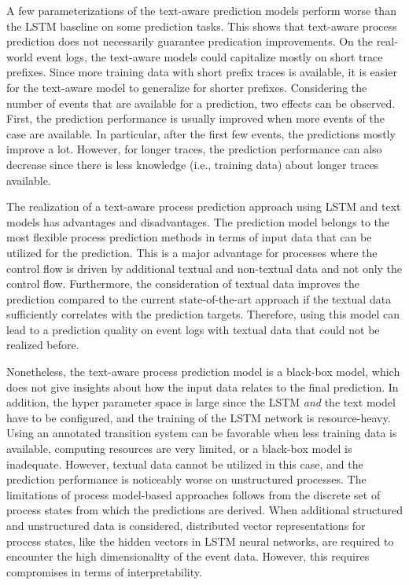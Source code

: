 A few parameterizations of the text-aware prediction models perform worse than the LSTM baseline on some prediction tasks.
This shows that text-aware process prediction does not necessarily guarantee predication improvements.
On the real-world event logs, the text-aware models could capitalize mostly on short trace prefixes.
Since more training data with short prefix traces is available, it is easier for the text-aware model to generalize for shorter prefixes.
Considering the number of events that are available for a prediction, two effects can be observed.
First, the prediction performance is usually improved when more events of the case are available.
In particular, after the first few events, the predictions mostly improve a lot.
However, for longer traces, the prediction performance can also decrease since there is less knowledge (i.e., training data) about longer traces available.

The realization of a text-aware process prediction approach using LSTM and text models has advantages and disadvantages.
The prediction model belongs to the most flexible process prediction methods in terms of input data that can be utilized for the prediction.
This is a major advantage for processes where the control flow is driven by additional textual and non-textual data and not only the control flow.
Furthermore, the consideration of textual data improves the prediction compared to the current state-of-the-art approach if the textual data sufficiently correlates with the prediction targets.
Therefore, using this model can lead to a prediction quality on event logs with textual data that could not be realized before.

Nonetheless, the text-aware process prediction model is a black-box model, which does not give insights about how the input data relates to the final prediction.
In addition, the hyper parameter space is large since the LSTM \textit{and} the text model have to be configured, and the training of the LSTM network is resource-heavy.
Using an annotated transition system can be favorable when less training data is available, computing resources are very limited, or a black-box model is inadequate.
However, textual data cannot be utilized in this case, and the prediction performance is noticeably worse on unstructured processes.
The limitations of process model-based approaches follows from the discrete set of process states from which the predictions are derived.
When additional structured and unstructured data is considered, distributed vector representations for process states, like the hidden vectors in LSTM neural networks, are required to encounter the high dimensionality of the event data.
However, this requires compromises in terms of interpretability.